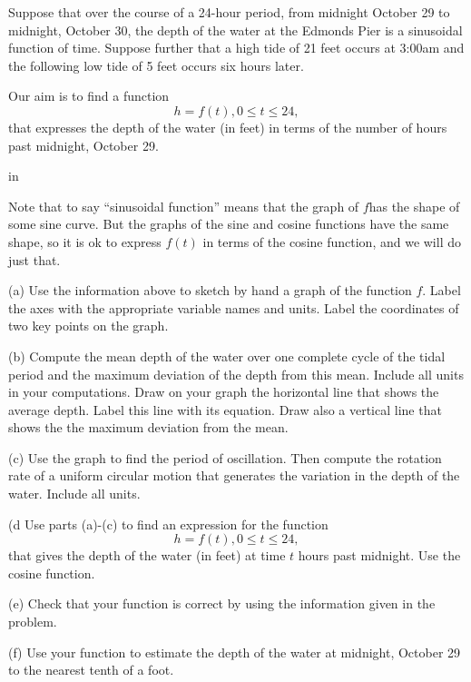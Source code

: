 \documentclass{ximera}
\newcommand{\pskip}{\vskip 0.1 in}
\begin{document}
\begin{example} \label{Ex4:Graphs}
Suppose that over the course of a 24-hour period, from midnight October 29 to midnight, October 30, the depth of the water at the Edmonds Pier is a sinusoidal function of time. Suppose further that a high tide of 21 feet occurs at 3:00am and the following low tide of 5 feet occurs six hours later. 

Our aim is to find a function
\[
    h = f(t) , 0\leq t \leq 24, 
\]
that expresses the depth of the water (in feet) in terms of the number of hours past midnight, October 29. 

\pskip

Note that to say ``sinusoidal function'' means that the graph of $f$has the shape of some sine curve. But the graphs of the sine and cosine functions have the same shape, so it is ok to express $f(t)$ in terms of the cosine function, and we will do just that.



(a) Use the information above to sketch by hand a graph of the function $f$. Label the axes with the appropriate variable names and units. Label the coordinates of two key points on the graph.

(b) Compute the mean depth of the water over one complete cycle of the tidal period and the maximum deviation of the depth from this mean. Include all units in your computations. Draw on your graph the horizontal line that shows the average depth. Label this line with its equation. Draw also a vertical line that shows the the maximum deviation from the mean.

(c) Use the graph to find the period of oscillation. Then compute the rotation rate of a uniform circular motion that generates the variation in the depth of the water. Include all units.

(d Use parts (a)-(c) to find an expression for the function 
\[
   h = f(t) ,  0\leq t \leq 24, 
\]
that gives the depth of the water (in feet) at time $t$ hours past midnight. Use the cosine function.

(e) Check that your function is correct by using the information given in the problem.

(f) Use your function to estimate the depth of the water at midnight, October 29 to the nearest tenth of a foot.


\end{example}
\end{document}
